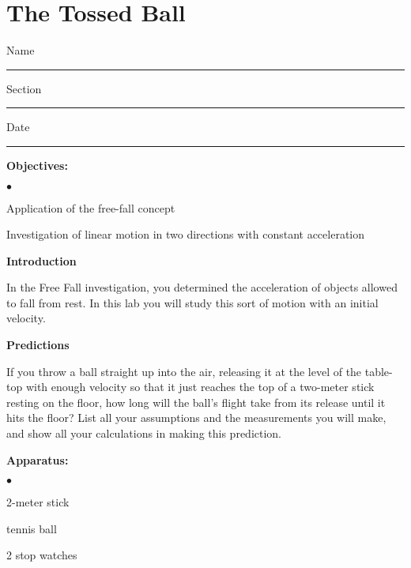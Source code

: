 
\section{The Tossed Ball}

Name \rule{2.0in}{0.1pt}\hfill{}Section \rule{1.0in}{0.1pt}\hfill{}Date \rule{1.0in}{0.1pt}

{\noindent \bf Objectives:} \begin{list}{$\bullet$}{\itemsep0pt }

\item Application of the free-fall concept \item Investigation of linear motion in two directions with constant acceleration

\end{list}

{\noindent \bf Introduction}

{\noindent In the Free Fall investigation, you determined the acceleration of objects allowed to fall from rest. In this lab you will study this sort of motion with an initial velocity.}

\medskip

{\noindent \bf Predictions}

{\noindent If you throw a ball straight up into the air, releasing it at the level of the table-top with enough velocity so that it just reaches the top of a two-meter stick resting on the floor, how long will the ball's flight take from its release until it hits the floor? List all your assumptions and the measurements you will make, and show all your calculations in making this prediction.}

\vspace{100pt}

{\noindent \bf Apparatus:} \begin{list}{$\bullet$}{\itemsep0pt }

\item 2-meter stick \item tennis ball \item 2 stop watches

\end{list}


